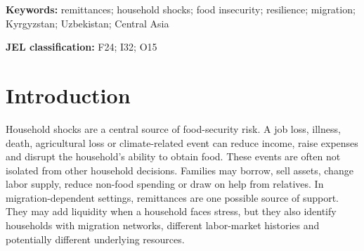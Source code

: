\documentclass[11pt]{article}
\begin{document}
\begin{abstract}
This paper asks whether the positive association between household shocks and food insecurity is weaker among remittance-receiving households in Kyrgyzstan and Uzbekistan. The analysis uses the 2019 wave of the Life in Kyrgyzstan Study and Listening to the Citizens of Uzbekistan rounds 49-82. Because the surveys differ in design, unit of observation, reference period and shock measurement, all models are country-specific and observational rather than pooled. Kazakhstan is included only as regional benchmark context. The preferred Kyrgyzstan model estimates a negative remittance-shock interaction of -0.2140 (95\% CI -0.6549 to 0.2269; p=0.3415), which is directionally consistent with a weaker shock-food-insecurity association but imprecise. The preferred Uzbekistan broad-shock model estimates a negative interaction of -0.5406 (95\% CI -1.0415 to -0.0398; p=0.03437). Four-group predictions are used to interpret the interaction on the food-insecurity raw-score scale and to separate baseline remittance differences from shock-period differences. The Uzbekistan household fixed-effects estimate remains negative but is smaller and imprecise (-0.1771; 95\% CI -0.5515 to 0.1973; p=0.3539). L2CU estimates are unweighted because the available \texttt{popw} documentation was not approved for this analysis. The findings are compatible with remittance-related moderation of household shock vulnerability, especially in Uzbekistan, but the evidence remains associational and subject to selection, timing and measurement limitations.
\end{abstract}

\noindent\textbf{Keywords:} remittances; household shocks; food insecurity; resilience; migration; Kyrgyzstan; Uzbekistan; Central Asia

\noindent\textbf{JEL classification:} F24; I32; O15

\section{Introduction}

Household shocks are a central source of food-security risk. A job loss, illness, death, agricultural loss or climate-related event can reduce income, raise expenses and disrupt the household's ability to obtain food. These events are often not isolated from other household decisions. Families may borrow, sell assets, change labor supply, reduce non-food spending or draw on help from relatives. In migration-dependent settings, remittances are one possible source of support. They may add liquidity when a household faces stress, but they also identify households with migration networks, different labor-market histories and potentially different underlying resources.
\end{document}
